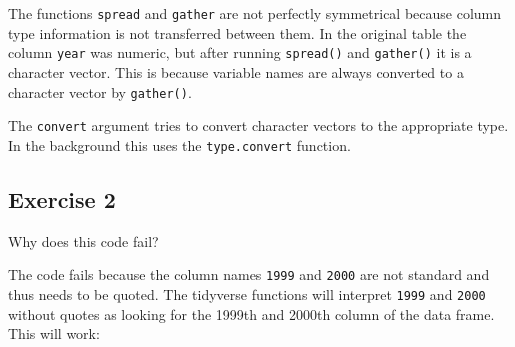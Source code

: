 \documentclass[]{book}
\newenvironment{Shaded}{\begin{snugshade}}{\end{snugshade}}
\newcommand{\CommentTok}[1]{\textcolor[rgb]{0.56,0.35,0.01}{\textit{#1}}}
\newcommand{\DataTypeTok}[1]{\textcolor[rgb]{0.13,0.29,0.53}{#1}}
\newcommand{\DecValTok}[1]{\textcolor[rgb]{0.00,0.00,0.81}{#1}}
\newcommand{\KeywordTok}[1]{\textcolor[rgb]{0.13,0.29,0.53}{\textbf{#1}}}
\newcommand{\NormalTok}[1]{#1}
\newcommand{\OperatorTok}[1]{\textcolor[rgb]{0.81,0.36,0.00}{\textbf{#1}}}
\newcommand{\OtherTok}[1]{\textcolor[rgb]{0.56,0.35,0.01}{#1}}
\newcommand{\StringTok}[1]{\textcolor[rgb]{0.31,0.60,0.02}{#1}}
\theoremstyle{plain}
\theoremstyle{remark}
\theoremstyle{definition}
\theoremstyle{definition}
\theoremstyle{definition}
\theoremstyle{remark}
\begin{document}
The functions \texttt{spread} and \texttt{gather} are not perfectly
symmetrical because column type information is not transferred between
them. In the original table the column \texttt{year} was numeric, but
after running \texttt{spread()} and \texttt{gather()} it is a character
vector. This is because variable names are always converted to a
character vector by \texttt{gather()}.

The \texttt{convert} argument tries to convert character vectors to the
appropriate type. In the background this uses the \texttt{type.convert}
function.

\begin{Shaded}
\end{Shaded}

\hypertarget{exercise-2-21}{%
\subsection{Exercise 2}\label{exercise-2-21}}

Why does this code fail?

\begin{Shaded}
\end{Shaded}

The code fails because the column names \texttt{1999} and \texttt{2000}
are not standard and thus needs to be quoted. The tidyverse functions
will interpret \texttt{1999} and \texttt{2000} without quotes as looking
for the 1999th and 2000th column of the data frame. This will work:
\end{document}
